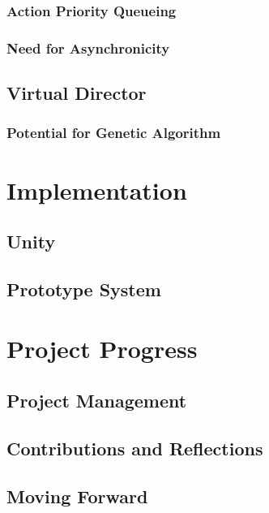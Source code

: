 \documentclass{sig-alternate-05-2015}
\begin{document}
\subsubsection{Action Priority Queueing}
\subsubsection{Need for Asynchronicity}
\subsection{Virtual Director}
\subsubsection{Potential for Genetic Algorithm}

\section{Implementation}
\subsection{Unity}
\subsection{Prototype System}

\section{Project Progress}
\subsection{Project Management}
\subsection{Contributions and Reflections}
\subsection{Moving Forward}

\newpage
{}
\end{document}
